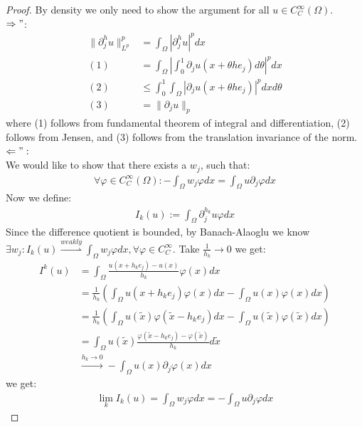 \begin{proof}
	By density we only need to show the argument for all $u \in C^\infty_C(\Omega)$.\\
	$\Rightarrow"$: 
	\begin{align*}
		\|\partial_j^h u \|_{L^p}^p &= \int_\Omega |\partial_j^h u|^p dx \\
		(1)&= \int_\Omega | \int_0^1 \partial_j u(x + \theta h e_j)d\theta|^p dx\\
		(2)&\leq \int_0^1\int_\Omega |\partial_j u(x + \theta h e_j)|^p dx d\theta\\
		(3)&= \|\partial_j u\|_p
	\end{align*}
	where (1) follows from fundamental theorem of integral and differentiation, (2) follows from Jensen, and (3) follows from the translation invariance of the norm.\\
	$\Leftarrow":$\\
	We would like to show that there exists a $w_j$, such that:
	\begin{align*}
		\forall \varphi \in C^\infty_C(\Omega): -\int_\Omega w_j \varphi dx = \int_\Omega u \partial_j \varphi dx
	\end{align*}
	Now we define:
	\begin{align*}
		I_k(u) := \int_\Omega \partial_j^{h_k} u \varphi dx
	\end{align*}
	Since the difference quotient is bounded, by Banach-Alaoglu we know $\exists w_j: I_k(u) \overset{weakly}{\rightharpoonup} \int_\Omega w_j \varphi dx,  \forall \varphi \in C_C^\infty$. Take $\frac{1}{h_k} \rightarrow 0$ we get:
	\begin{align*}
		I^k(u) &= \int_\Omega \frac{u(x + h_ke_j) - u(x)}{h_k} \varphi(x) dx \\
		&= \frac{1}{h_k} (\int_\Omega u(x + h_k e_j)\varphi(x)dx - \int_\Omega u(x) \varphi(x)dx)\\
		&= \frac{1}{h_k}(\int_\Omega u(\tilde{x}) \varphi(\tilde{x} - h_k e_j)dx - \int_\Omega u(\tilde{x})\varphi(\tilde{x})dx)\\
		&=  \int_\Omega u(\tilde{x}) \frac{\varphi(\tilde{x} - h_k e_j) - \varphi(\tilde{x})}{h_k} d\tilde{x}    \\
		&\overset{h_k \rightarrow 0}{\rightarrow} -\int_\Omega u(x) \partial_j \varphi(x)dx 
	\end{align*}
	we get:
	\begin{align*}
		\lim_k I_k(u) = \int_\Omega w_j \varphi dx = -\int_\Omega u \partial_j \varphi dx 
	\end{align*} 
\end{proof}

